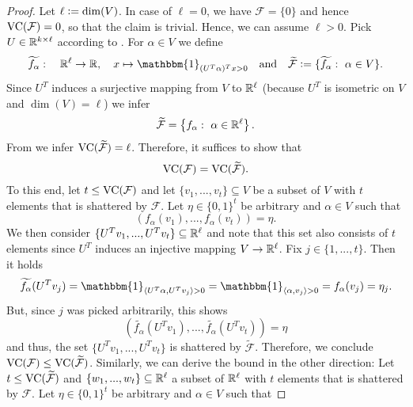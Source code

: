 \begin{proof}
Let $\ell \mathrel{\mathop:}= \dim(V)$. 
In case of $\ell = 0$, we have $\mathcal{F} = \{0\}$ and hence $\operatorname{VC}(\mathcal{F}) = 0$, so that the claim is trivial.
Hence, we can assume $\ell > 0$.
Pick $U \in \mathbb{R}^{k \times \ell}$ according to .
For $\alpha \in V$ we define
\begin{equation*}
\widetilde{f_\alpha}: \quad \RR^\ell \to \RR, \quad x \mapsto \mathbbm{1}_{(U^T\alpha)^T x > 0}\quad \text{and}\quad \widetilde{\mathcal{F}} \defeq \{ \widetilde{f_\alpha}: \ \alpha \in V\}.
\end{equation*}
Since $U^T$ induces a surjective mapping from $V$ to $\mathbb{R}^\ell$ (because $U^T$ is isometric on $V$ and $\dim(V) = \ell$) we infer
\begin{equation*}
\widetilde{\mathcal{F}} = \left\{f_\alpha : \ \alpha \in \mathbb{R}^\ell\right\}.
\end{equation*}
From \cite[Theorem 9.2]{shalev2014understanding} we infer $\operatorname{VC}(\widetilde{\mathcal{F}}) = \ell$. 
Therefore, it suffices to show that
\begin{equation*}
\operatorname{VC}(\mathcal{F}) = \operatorname{VC}(\mathcal{\widetilde{F}}).
\end{equation*}
To this end, let $t \leq \operatorname{VC}(\mathcal{F})$ and let $\{v_1, ..., v_t\} \subseteq V$ be a subset of $V$ with $t$ elements that is shattered by $\mathcal{F}$.
Let $\eta \in \{0,1\}^t$ be arbitrary and $\alpha \in V$ such that
\begin{equation*}
(f_\alpha(v_1),..., f_\alpha(v_t)) = \eta.
\end{equation*}
We then consider $\{U^Tv_1, ..., U^T v_t\} \subseteq \mathbb{R}^\ell$ and note that this set also consists of $t$ elements since $U^T$ induces an injective mapping $V \to \mathbb{R}^\ell$. 
Fix $j \in \{1,...,t\}$.
Then it holds
\begin{equation*}
\widetilde{f_\alpha}(U^Tv_j) = \mathbbm{1}_{\langle U^T\alpha, U^T v_j\rangle>0} = \mathbbm{1}_{\langle \alpha, v_j \rangle > 0} = f_\alpha(v_j)= \eta_j.
\end{equation*}
But, since $j$ was picked arbitrarily, this shows
\begin{equation*}
(\widetilde{f_\alpha}(U^T v_1), ...,\widetilde{f_\alpha}( U^T v_t)) = \eta
\end{equation*}
and thus, the set $\{U^Tv_1, ..., U^T v_t\}$ is shattered by $\widetilde{\mathcal{F}}$.
Therefore, we conclude $\operatorname{VC} (\mathcal{F}) \leq \operatorname{VC}(\widetilde{\mathcal{F}})$.
Similarly, we can derive the bound in the other direction: Let $t \leq \operatorname{VC}(\widetilde{\mathcal{F}})$ and $\{w_1 ,..., w_t\} \subseteq \mathbb{R}^\ell$ a subset of $\mathbb{R}^\ell$ with $t$ elements that is shattered by $\mathcal{F}$. Let $\eta \in \{0,1\}^t$ be arbitrary and $\alpha \in V$ such that

\end{proof}
